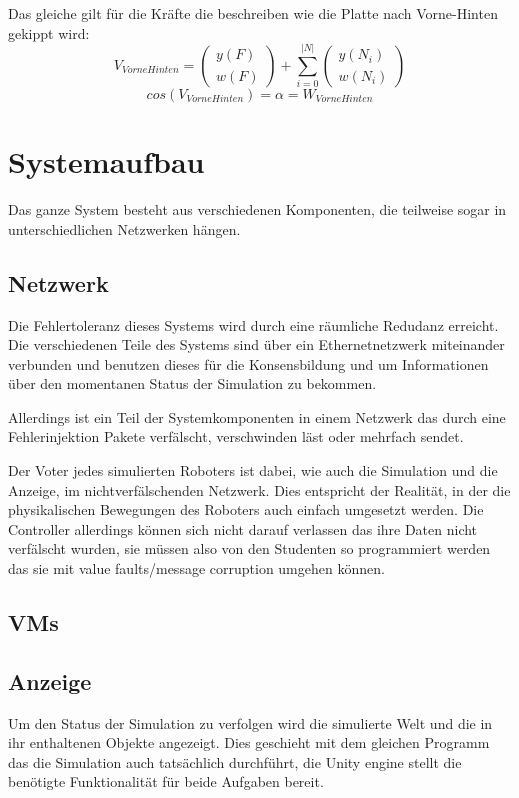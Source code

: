 \documentclass[
    12pt,
    bibliography=totoc,
    ngerman
]{scrartcl}
\begin{document}
Das gleiche gilt f{\"{u}}r die Kr{\"{a}}fte die beschreiben wie die Platte nach Vorne-Hinten gekippt wird:
$$ V_{VorneHinten} = \begin{pmatrix}y(F) \\ w(F) \end{pmatrix} + \sum_{i=0}^{|N|} \begin{pmatrix} y(N_i) \\ w(N_i) \end{pmatrix} $$
$$ cos(V_{VorneHinten}) = \alpha = W_{VorneHinten} $$

\clearpage
\section{Systemaufbau}
Das ganze System besteht aus verschiedenen Komponenten, die teilweise sogar in unterschiedlichen Netzwerken h{\"{a}}ngen. 

\subsection{Netzwerk}\label{network}
Die Fehlertoleranz dieses Systems wird durch eine r{\"{a}}umliche Redudanz erreicht. Die verschiedenen Teile des Systems sind {\"{u}}ber ein Ethernetnetzwerk miteinander verbunden und benutzen dieses
f{\"{u}}r die Konsensbildung und um Informationen {\"{u}}ber den momentanen Status der Simulation zu bekommen.

Allerdings ist ein Teil der Systemkomponenten in einem Netzwerk das durch eine Fehlerinjektion Pakete verf{\"{a}}lscht, verschwinden l{\"{a}}st oder mehrfach sendet. 

Der Voter jedes simulierten Roboters ist dabei, wie auch die Simulation und die Anzeige, im nichtverf{\"{a}}lschenden Netzwerk. Dies entspricht der Realit{\"{a}}t, in der die physikalischen Bewegungen
des Roboters auch einfach umgesetzt werden. Die Controller allerdings k{\"{o}}nnen sich nicht darauf verlassen das ihre Daten nicht verf{\"{a}}lscht wurden, sie m{\"{u}}ssen also von den Studenten so
programmiert werden das sie mit value faults/message corruption\cite{richling-ass} umgehen k{\"{o}}nnen.

\subsection{VMs}

\subsection{Anzeige}\label{graphics}
Um den Status der Simulation zu verfolgen wird die simulierte Welt und die in ihr enthaltenen Objekte angezeigt. Dies geschieht mit dem gleichen Programm das die Simulation auch tats{\"{a}}chlich
durchf{\"{u}}hrt, die Unity engine stellt die ben{\"{o}}tigte Funktionalit{\"{a}}t f{\"{u}}r beide Aufgaben bereit.
\end{document}
